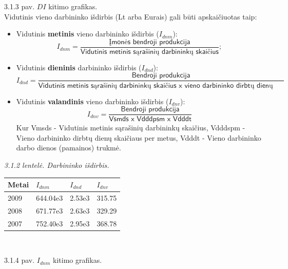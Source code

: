 \documentclass[11pt,a4paper]{article}
\begin{document}
\begin{center}
\end{center}
\textsf{3.1.3 pav. $DI$ kitimo grafikas.}\\

Vidutinis vieno darbininko išdirbis (Lt arba Eurais) gali būti apskaičiuotas taip:
\begin{itemize}
	\item Vidutinis \textbf{metinis} vieno darbininko išdirbis ($I_{dnm}$):
	\[
		I_{dnm} = \frac{
			\textsf{Įmonės bendroji produkcija}
		}{
			\textsf{Vidutinis metinis sąrašinių darbininkų skaičius}
		};
	\]
	\item Vidutinis \textbf{dieninis} darbininko išdirbis ($I_{dnd}$):
	\[
		I_{dnd} = \frac{
			\textsf{Bendroji produkcija}
		}{
			\textsf{Vidutinis metinis sąrašinių darbininkų skaičius x vieno darbininko dirbtų dienų skaičius}
		}
	\]
	\item Vidutinis \textbf{valandinis} vieno darbininko išdirbis ($I_{dnv}$):
	\[
		I_{dnv} = \frac{
			\textsf{Bendroji produkcija}
		}{
			\textsf{Vsmds x Vdddpsm x Vdddt}
		}
	\]
	Kur Vmsds - Vidutinis metinis sąrašinių darbininkų skaičius, Vdddspm - Vieno darbininko dirbtų dienų skaičiaus per metus, Vdddt - Vieno darbininko darbo dienos (pamainos) trukmė.
\end{itemize}
\textsl{3.1.2 lentelė. Darbininko išdirbis.}\\
\begin{tabular}{|p{4cm}|p{4cm}|p{4cm}|p{4cm}|} \hline
	Metai & $I_{dnm}$ & $I_{dnd}$ & $I_{dnv}$ \\ \hline
	2009 	& 644.04e3 & 2.53e3 & 315.75  \\ \hline
	2008  & 671.77e3 & 2.63e3 & 329.29 \\ \hline
	2007  & 752.40e3 & 2.95e3 & 368.78 \\ \hline
\end{tabular}\\

\begin{center}
\end{center}
\textsf{3.1.4 pav. $I_{dnm}$ kitimo grafikas.}\\
\end{document}
